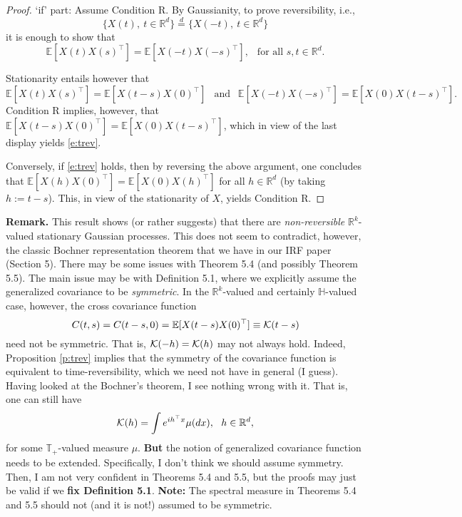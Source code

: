 \documentclass[11pt]{article}
\def\E{\mathbb E}
\def\R{\mathbb R}
\def\Rd{\R^d}
\def\eqd{\stackrel{d}{=}}
\theoremstyle{plain}
\theoremstyle{definition}
\theoremstyle{condition}
\theoremstyle{remark}
\begin{document}
\begin{proof}  `if' part: Assume Condition R.  By Gaussianity, to prove reversibility, i.e.,
$$ 
\{X(t),\ t\in\R^d\} \eqd \{ X(-t),\ t\in\Rd\}
$$ 
it is enough to show that
\begin{equation}\label{e:trev}
\E [ X(t) X(s)^\top] = \E [ X(-t)X(-s)^\top],\ \ \mbox{ for all }s,t\in\Rd.
\end{equation}

Stationarity entails however that
$$
\E [ X(t) X(s)^\top]  = \E [ X(t-s) X(0)^\top]\ \ \mbox{ and }\ \ \E[X(-t)X(-s)^\top] = \E[X(0)X(t-s)^\top].
$$
Condition R implies, however, that $\E [X(t-s) X(0)^\top] = \E[X(0)X(t-s)^\top]$, which in view of the last display yields \eqref{e:trev}.

Conversely, if \eqref{e:trev} holds, then by reversing the above argument, one concludes that $\E[X(h)X(0)^\top] = \E[X(0)X(h)^\top]$ for all $h\in\Rd$ 
(by taking $h:=t-s$). This, in view of the stationarity of $X$, yields Condition R.
\end{proof}

{\bf Remark.}  This result shows (or rather suggests) that there are {\em non-reversible} $\R^k$-valued stationary Gaussian processes.  This does not seem to 
contradict, however, the classic Bochner representation theorem that we have in our IRF paper (Section 5).  There may be some issues with 
Theorem 5.4  (and possibly Theorem 5.5).  The main issue may be with Definition 5.1, where we explicitly assume the generalized covariance to be {\em symmetric}.
In the $\R^k$-valued and certainly $\mathbb H$-valued case, however, the cross covariance function
$$
C(t,s) = C(t-s,0) = \E[ X(t-s) X(0)^\top] \equiv {\cal K}(t-s)
$$
need not be symmetric.  That is, ${\cal K}(-h) = {\cal K}(h)$ may not always hold.  Indeed, Proposition \ref{p:trev} implies that the symmetry of the covariance function is
equivalent to time-reversibility, which we need not have in general (I guess).  Having looked at the Bochner's theorem, I see nothing wrong with it.  That is, one can still have
$$
{\cal K}(h) = \int e^{i h^\top x} \mu(dx),\ \ h\in\Rd,
$$
for some ${\mathbb T}_+$-valued measure $\mu$. {\bf But} the notion of generalized covariance function needs to be extended.  Specifically, I don't think we should assume
symmetry.  Then, I am not very confident in Theorems 5.4 and 5.5, but the proofs may just be valid if we {\bf fix Definition 5.1}.  {\bf Note:} The spectral measure in Theorems 5.4 and
5.5 should not (and it is not!) assumed to be symmetric.
\end{document}
